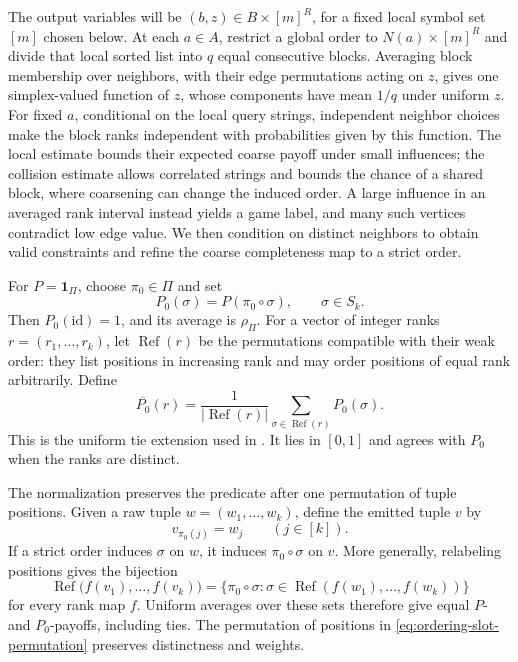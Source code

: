 The output variables will be \((b,z)\in B\times[m]^R\), for a fixed
local symbol set \([m]\) chosen below. At each \(a\in A\), restrict a
global order to \(N(a)\times[m]^R\) and divide that local sorted list
into \(q\) equal consecutive blocks. Averaging block membership over
neighbors, with their edge permutations acting on \(z\), gives one
simplex-valued function of \(z\), whose components have mean \(1/q\)
under uniform \(z\). For fixed \(a\), conditional on the local query
strings, independent neighbor choices make the block ranks independent
with probabilities given by this function. The local estimate bounds
their expected coarse payoff under small influences; the collision
estimate allows correlated strings and bounds the chance of a shared
block, where coarsening can change the induced order. A large influence
in an averaged rank interval instead yields a game label, and many such
vertices contradict low edge value. We then condition on distinct
neighbors to obtain valid constraints and refine the coarse completeness
map to a strict order.

For \(P=\mathbf1_\Pi\), choose \(\pi_0\in\Pi\) and set
\[
 P_0(\sigma)=P(\pi_0\circ\sigma),\qquad \sigma\in S_k.
\]
Then \(P_0(\mathrm{id})=1\), and its average is \(\rho_\Pi\).
For a vector of integer ranks \(r=(r_1,\ldots,r_k)\), let
\(\operatorname{Ref}(r)\) be the permutations compatible with their
weak order: they list positions in increasing rank and may order
positions of equal rank arbitrarily.  Define
\begin{equation}
 \overline{P_0}(r)=
 \frac1{|\operatorname{Ref}(r)|}
 \sum_{\sigma\in\operatorname{Ref}(r)}P_0(\sigma).
\label{eq:ordering-tie-payoff}
\end{equation}
This is the uniform tie extension used in
\cite[Section~8.2]{GuruswamiEtAl2011OrderingCSP}.  It lies in
\([0,1]\) and agrees with \(P_0\) when the ranks are distinct.

The normalization preserves the predicate after one permutation of
tuple positions.  Given a raw tuple \(w=(w_1,\ldots,w_k)\), define
the emitted tuple \(v\) by
\begin{equation}
 v_{\pi_0(j)}=w_j\qquad(j\in[k]).
\label{eq:ordering-slot-permutation}
\end{equation}
If a strict order induces \(\sigma\) on \(w\), it induces
\(\pi_0\circ\sigma\) on \(v\).  More generally, relabeling positions
gives the bijection
\[
 \operatorname{Ref}\bigl(f(v_1),\ldots,f(v_k)\bigr)
 =
 \{\pi_0\circ\sigma:
       \sigma\in\operatorname{Ref}(f(w_1),\ldots,f(w_k))\}
\]
for every rank map \(f\).  Uniform averages over these sets therefore
give equal \(P\)- and \(P_0\)-payoffs, including ties.  The permutation
of positions in \eqref{eq:ordering-slot-permutation} preserves
distinctness and weights.


